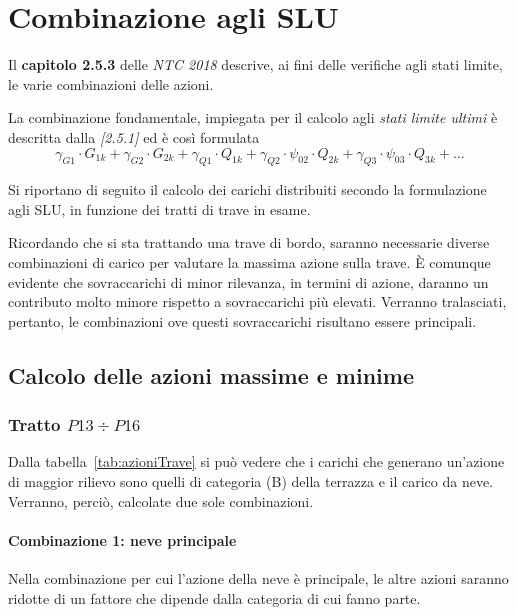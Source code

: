 \section{Combinazione agli SLU}
Il \textbf{capitolo 2.5.3} delle \emph{NTC 2018} descrive, ai fini delle verifiche agli stati limite, le varie combinazioni delle azioni. 

La combinazione fondamentale, impiegata per il calcolo agli \emph{stati limite ultimi} è descritta dalla \emph{[2.5.1]} ed è così formulata
\[
	\gamma_{G1}\cdot G_{1k} + \gamma_{G2}\cdot G_{2k} + \gamma_{Q1} \cdot Q_{1k} + \gamma_{Q2}\cdot \psi_{02}\cdot Q_{2k} + \gamma_{Q3}\cdot \psi_{03}\cdot Q_{3k} + \dots
\]

Si riportano di seguito il calcolo dei carichi distribuiti secondo la formulazione agli SLU, in funzione dei tratti di trave in esame.

Ricordando che si sta trattando una trave di bordo, saranno necessarie diverse combinazioni di carico per valutare la massima azione sulla trave. È comunque evidente che sovraccarichi di minor rilevanza, in termini di azione, daranno un contributo molto minore rispetto a sovraccarichi più elevati. Verranno tralasciati, pertanto, le combinazioni ove questi sovraccarichi risultano essere principali.

\subsection{Calcolo delle azioni massime e minime}

\subsubsection*{Tratto $P13\div P16$}
Dalla tabella~\ref{tab:azioniTrave} si può vedere che i carichi che generano un'azione di maggior rilievo sono quelli di categoria (B) della terrazza e il carico da neve. Verranno, perciò, calcolate due sole combinazioni.

\paragraph{Combinazione 1: neve principale}
Nella combinazione per cui l'azione della neve è principale, le altre azioni saranno ridotte di un fattore che dipende dalla categoria di cui fanno parte.

